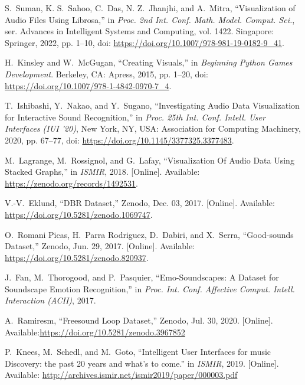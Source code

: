 \documentclass{article}
\begin{document}
\begin{thebibliography}{citations}
S.~Suman, K. S.~Sahoo, C.~Das, N. Z.~Jhanjhi, and A.~Mitra, ``Visualization of Audio Files Using Librosa,'' in \emph{Proc. 2nd Int. Conf. Math. Model. Comput. Sci.}, ser. Advances in Intelligent Systems and Computing, vol. 1422. Singapore: Springer, 2022, pp. 1–10, doi: \url{https://doi.org/10.1007/978-981-19-0182-9_41}.

H.~Kinsley and W.~McGugan, ``Creating Visuals,'' in \emph{Beginning Python Games Development}. Berkeley, CA: Apress, 2015, pp. 1–20, doi: \url{https://doi.org/10.1007/978-1-4842-0970-7_4}.

T.~Ishibashi, Y.~Nakao, and Y.~Sugano, ``Investigating Audio Data Visualization for Interactive Sound Recognition,'' in \emph{Proc. 25th Int. Conf. Intell. User Interfaces (IUI '20)}, New York, NY, USA: Association for Computing Machinery, 2020, pp. 67–77, doi: \url{https://doi.org/10.1145/3377325.3377483}.

M.~Lagrange, M.~Rossignol, and G.~Lafay, ``Visualization Of Audio Data Using Stacked Graphs,'' in \emph{ISMIR}, 2018. [Online]. Available: \url{https://zenodo.org/records/1492531}.

V.-V.~Eklund, ``DBR Dataset,'' Zenodo, Dec. 03, 2017. [Online]. Available: \url{https://doi.org/10.5281/zenodo.1069747}.

O.~Romani Picas, H.~Parra Rodriguez, D.~Dabiri, and X.~Serra, ``Good-sounds Dataset,'' Zenodo, Jun. 29, 2017. [Online]. Available: \url{https://doi.org/10.5281/zenodo.820937}.

J.~Fan, M.~Thorogood, and P.~Pasquier, ``Emo-Soundscapes: A Dataset for Soundscape Emotion Recognition,'' in \emph{Proc. Int. Conf. Affective Comput. Intell. Interaction (ACII)}, 2017.

A.~Ramiresm, ``Freesound Loop Dataset,'' Zenodo, Jul. 30, 2020. [Online]. Available:\url{https://doi.org/10.5281/zenodo.3967852}

P.~Knees, M.~Schedl, and M.~Goto, ``Intelligent User Interfaces for music Discovery: the past 20 years and what’s to come.'' in \emph{ISMIR}, 2019. [Online]. Available: \url{http://archives.ismir.net/ismir2019/paper/000003.pdf}




\end{thebibliography}
\end{document}
